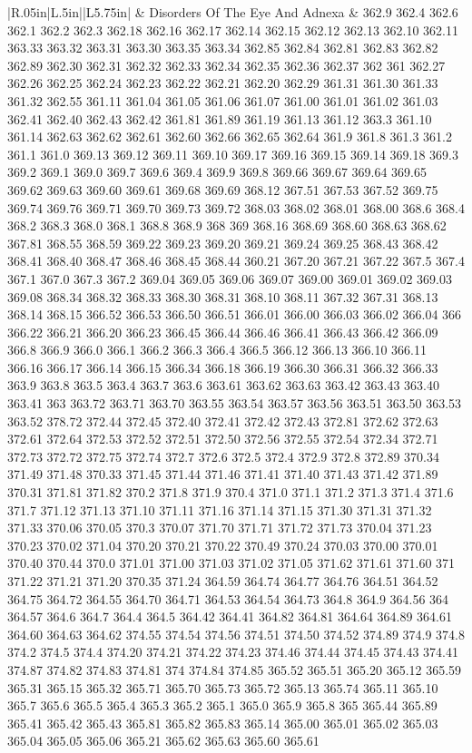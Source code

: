 \begin{longtable}{|R{.05in}|L{.5in}||L{5.75in}|}
    & Disorders Of The Eye And Adnexa &   362.9 362.4 362.6 362.1 362.2 362.3 362.18 362.16 362.17 362.14 362.15 362.12 362.13 362.10 362.11 363.33 363.32 363.31 363.30 363.35 363.34 362.85 362.84 362.81 362.83 362.82 362.89 362.30 362.31 362.32 362.33 362.34 362.35 362.36 362.37 362 361 362.27 362.26 362.25 362.24 362.23 362.22 362.21 362.20 362.29 361.31 361.30 361.33 361.32 362.55 361.11 361.04 361.05 361.06 361.07 361.00 361.01 361.02 361.03 362.41 362.40 362.43 362.42 361.81 361.89 361.19 361.13 361.12 363.3 361.10 361.14 362.63 362.62 362.61 362.60 362.66 362.65 362.64 361.9 361.8 361.3 361.2 361.1 361.0 369.13 369.12 369.11 369.10 369.17 369.16 369.15 369.14 369.18 369.3 369.2 369.1 369.0 369.7 369.6 369.4 369.9 369.8 369.66 369.67 369.64 369.65 369.62 369.63 369.60 369.61 369.68 369.69 368.12 367.51 367.53 367.52 369.75 369.74 369.76 369.71 369.70 369.73 369.72 368.03 368.02 368.01 368.00 368.6 368.4 368.2 368.3 368.0 368.1 368.8 368.9 368 369 368.16 368.69 368.60 368.63 368.62 367.81 368.55 368.59 369.22 369.23 369.20 369.21 369.24 369.25 368.43 368.42 368.41 368.40 368.47 368.46 368.45 368.44 360.21 367.20 367.21 367.22 367.5 367.4 367.1 367.0 367.3 367.2 369.04 369.05 369.06 369.07 369.00 369.01 369.02 369.03 369.08 368.34 368.32 368.33 368.30 368.31 368.10 368.11 367.32 367.31 368.13 368.14 368.15 366.52 366.53 366.50 366.51 366.01 366.00 366.03 366.02 366.04 366 366.22 366.21 366.20 366.23 366.45 366.44 366.46 366.41 366.43 366.42 366.09 366.8 366.9 366.0 366.1 366.2 366.3 366.4 366.5 366.12 366.13 366.10 366.11 366.16 366.17 366.14 366.15 366.34 366.18 366.19 366.30 366.31 366.32 366.33 363.9 363.8 363.5 363.4 363.7 363.6 363.61 363.62 363.63 363.42 363.43 363.40 363.41 363 363.72 363.71 363.70 363.55 363.54 363.57 363.56 363.51 363.50 363.53 363.52 378.72 372.44 372.45 372.40 372.41 372.42 372.43 372.81 372.62 372.63 372.61 372.64 372.53 372.52 372.51 372.50 372.56 372.55 372.54 372.34 372.71 372.73 372.72 372.75 372.74 372.7 372.6 372.5 372.4 372.9 372.8 372.89 370.34 371.49 371.48 370.33 371.45 371.44 371.46 371.41 371.40 371.43 371.42 371.89 370.31 371.81 371.82 370.2 371.8 371.9 370.4 371.0 371.1 371.2 371.3 371.4 371.6 371.7 371.12 371.13 371.10 371.11 371.16 371.14 371.15 371.30 371.31 371.32 371.33 370.06 370.05 370.3 370.07 371.70 371.71 371.72 371.73 370.04 371.23 370.23 370.02 371.04 370.20 370.21 370.22 370.49 370.24 370.03 370.00 370.01 370.40 370.44 370.0 371.01 371.00 371.03 371.02 371.05 371.62 371.61 371.60 371 371.22 371.21 371.20 370.35 371.24 364.59 364.74 364.77 364.76 364.51 364.52 364.75 364.72 364.55 364.70 364.71 364.53 364.54 364.73 364.8 364.9 364.56 364 364.57 364.6 364.7 364.4 364.5 364.42 364.41 364.82 364.81 364.64 364.89 364.61 364.60 364.63 364.62 374.55 374.54 374.56 374.51 374.50 374.52 374.89 374.9 374.8 374.2 374.5 374.4 374.20 374.21 374.22 374.23 374.46 374.44 374.45 374.43 374.41 374.87 374.82 374.83 374.81 374 374.84 374.85 365.52 365.51 365.20 365.12 365.59 365.31 365.15 365.32 365.71 365.70 365.73 365.72 365.13 365.74 365.11 365.10 365.7 365.6 365.5 365.4 365.3 365.2 365.1 365.0 365.9 365.8 365 365.44 365.89 365.41 365.42 365.43 365.81 365.82 365.83 365.14 365.00 365.01 365.02 365.03 365.04 365.05 365.06 365.21 365.62 365.63 365.60 365.61 
\end{longtable}
